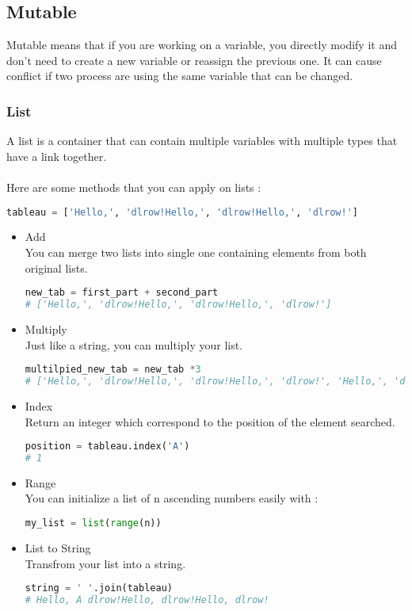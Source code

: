 \documentclass[a4paper, 12pt, titlepage]{scrartcl} %
\begin{document}
\subsection{Mutable}
Mutable means that if you are working on a variable, you directly modify it and don't need to create a new variable or reassign the previous one. It can cause conflict if two process are using the same variable that can be changed.\newline

\subsubsection{List}
A list is a container that can contain multiple variables with multiple types that have a link together.\\ \\
Here are some methods that you can apply on lists : 

\begin{lstlisting}[language=Python]
tableau = ['Hello,', 'dlrow!Hello,', 'dlrow!Hello,', 'dlrow!']
\end{lstlisting}

\begin{itemize}
\item Add \\
You can merge two lists into single one containing elements from both original lists.
\begin{lstlisting}[language=Python]
new_tab = first_part + second_part
# ['Hello,', 'dlrow!Hello,', 'dlrow!Hello,', 'dlrow!']
\end{lstlisting}

\item Multiply \\
Just like a string, you can multiply your list.
\begin{lstlisting}[language=Python]
multilpied_new_tab = new_tab *3
# ['Hello,', 'dlrow!Hello,', 'dlrow!Hello,', 'dlrow!', 'Hello,', 'dlrow!Hello,', 'dlrow!Hello,', 'dlrow!', 'Hello,', 'dlrow!Hello,', 'dlrow!Hello,', 'dlrow!']
\end{lstlisting}

\item Index \\
Return an integer which correspond to the position of the element searched.
\begin{lstlisting}[language=Python]
position = tableau.index('A')
# 1
\end{lstlisting}

\item Range \\
You can initialize a list of n ascending numbers easily with : 
\begin{lstlisting}[language=Python]
my_list = list(range(n))
\end{lstlisting}

\item List to String \\
Transfrom your list into a string.
\begin{lstlisting}[language=Python]
string = ' '.join(tableau)
# Hello, A dlrow!Hello, dlrow!Hello, dlrow!
\end{lstlisting}
\end{itemize}
\end{document}
